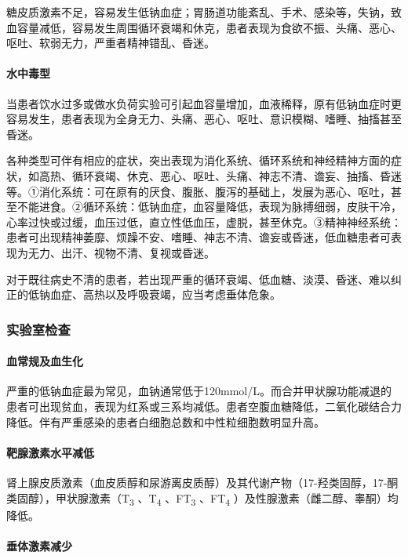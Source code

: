糖皮质激素不足，容易发生低钠血症；胃肠道功能紊乱、手术、感染等，失钠，致血容量减低，容易发生周围循环衰竭和休克，患者表现为食欲不振、头痛、恶心、呕吐、软弱无力，严重者精神错乱、昏迷。

\paragraph{水中毒型}

当患者饮水过多或做水负荷实验可引起血容量增加，血液稀释，原有低钠血症时更容易发生，患者表现为全身无力、头痛、恶心、呕吐、意识模糊、嗜睡、抽搐甚至昏迷。

各种类型可伴有相应的症状，突出表现为消化系统、循环系统和神经精神方面的症状，如高热、循环衰竭、休克、恶心、呕吐、头痛、神志不清、谵妄、抽搐、昏迷等。①消化系统：可在原有的厌食、腹胀、腹泻的基础上，发展为恶心、呕吐，甚至不能进食。②循环系统：低钠血症，血容量降低，表现为脉搏细弱，皮肤干冷，心率过快或过缓，血压过低，直立性低血压，虚脱，甚至休克。③精神神经系统：患者可出现精神萎靡、烦躁不安、嗜睡、神志不清、谵妄或昏迷，低血糖患者可表现为无力、出汗、视物不清、复视或昏迷。

对于既往病史不清的患者，若出现严重的循环衰竭、低血糖、淡漠、昏迷、难以纠正的低钠血症、高热以及呼吸衰竭，应当考虑垂体危象。

\subsubsection{实验室检查}

\paragraph{血常规及血生化}

严重的低钠血症最为常见，血钠通常低于120mmol/L。而合并甲状腺功能减退的患者可出现贫血，表现为红系或三系均减低。患者空腹血糖降低，二氧化碳结合力降低。伴有严重感染的患者白细胞总数和中性粒细胞数明显升高。

\paragraph{靶腺激素水平减低}

肾上腺皮质激素（血皮质醇和尿游离皮质醇）及其代谢产物（17-羟类固醇，17-酮类固醇），甲状腺激素（T\textsubscript{3}
、T\textsubscript{4} 、FT\textsubscript{3} 、FT\textsubscript{4}
）及性腺激素（雌二醇、睾酮）均降低。

\paragraph{垂体激素减少}

